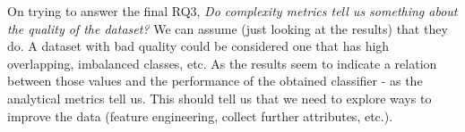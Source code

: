 On trying to answer the final RQ3, \textit{Do complexity metrics tell us 
something about the quality of the dataset?} We can assume 
(just looking at the results) that they do. A dataset with bad quality could be 
considered one that has high overlapping, imbalanced classes, etc. As the 
results seem to indicate a relation between those values and the performance of 
the obtained classifier - as the analytical metrics tell us. This should tell us 
that we need to explore ways to improve the data (feature engineering, collect 
further attributes, etc.).




